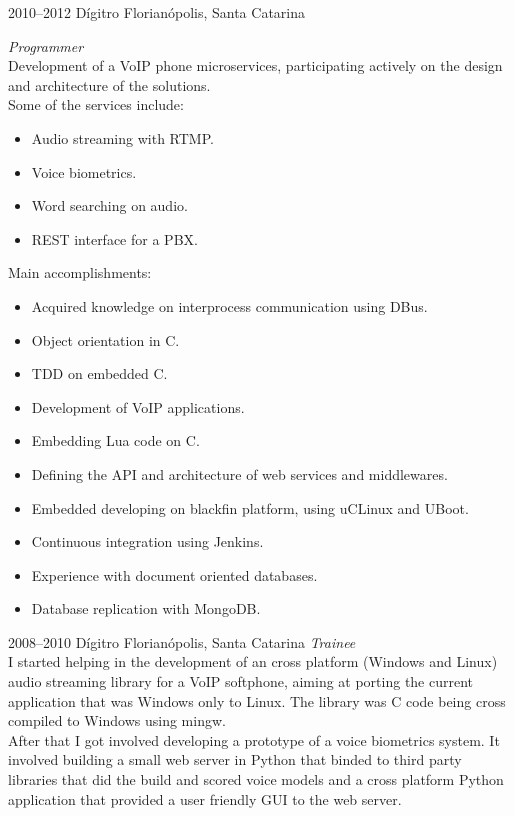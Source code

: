 \documentclass[]{friggeri-cv} %
\begin{document}
\begin{entrylist}
\entry
{2010--2012}
{Dígitro}
{Florianópolis, Santa Catarina}
{\emph{Programmer} \\

Development of a VoIP phone microservices, participating actively on the design and
architecture of the solutions.\\

Some of the services include:\\
\begin{itemize}
\item Audio streaming with RTMP.
\item Voice biometrics.
\item Word searching on audio.
\item REST interface for a PBX.\\
\end{itemize}

Main accomplishments:\\

\begin{itemize}
\item Acquired knowledge on interprocess communication using DBus.
\item Object orientation in C.
\item TDD on embedded C.
\item Development of VoIP applications.
\item Embedding Lua code on C.
\item Defining the API and architecture of web services and middlewares.
\item Embedded developing on blackfin platform, using uCLinux and UBoot.
\item Continuous integration using Jenkins.
\item Experience with document oriented databases.
\item Database replication with MongoDB.\\
\end{itemize}
}
\end{entrylist}
\begin{entrylist}
\entry
{2008--2010}
{Dígitro}
{Florianópolis, Santa Catarina}
{\emph{Trainee} \\

I started helping in the development of an
cross platform (Windows and Linux) audio streaming
library for a VoIP softphone, aiming at porting
the current application that was Windows only to Linux.
The library was C code being cross compiled to Windows using mingw.\\

After that I got involved developing a prototype of a voice
biometrics system. It involved building a small web server
in Python that binded to third party libraries that did
the build and scored voice models and a cross platform
Python application that provided a user friendly GUI
to the web server.
}
\end{entrylist}
\end{document}
